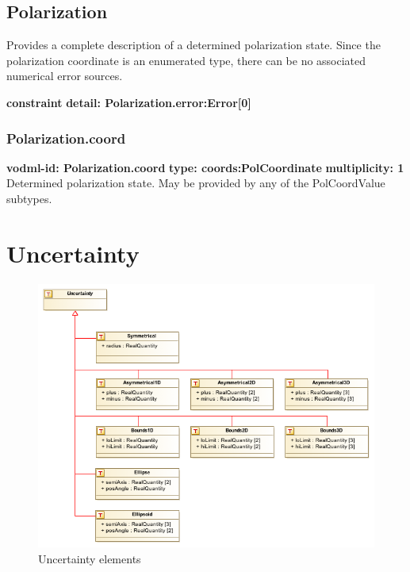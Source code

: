   \subsection{Polarization}
  \label{sect:Polarization}
    Provides a complete description of a determined polarization state. Since the polarization coordinate is an enumerated type, there can be no associated numerical error sources.

    \noindent \textbf{constraint} \newline
    \indent    \textbf{detail: Polarization.error:Error[0] }\newline


    \subsubsection{Polarization.coord}
      \textbf{vodml-id: Polarization.coord} \newline
      \textbf{type: coords:PolCoordinate} \newline
      \textbf{multiplicity: 1} \newline 
      Determined polarization state. May be provided by any of the PolCoordValue subtypes.

\pagebreak
\section{Uncertainty}

  \begin{figure}[h]
  \begin{center}
    \includegraphics[width=5in]{diagrams/Uncertainty.png}
    \caption{Uncertainty elements}\label{fig:uncertainty}
  \end{center}
  \end{figure}


